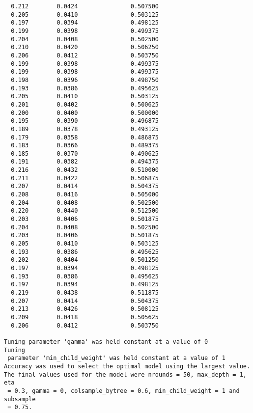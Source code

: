 \documentclass[
  letterpaper,
  DIV=11,
  numbers=noendperiod]{scrartcl}
\begin{document}
\begin{verbatim}
  0.212        0.0424               0.507500              
  0.205        0.0410               0.503125              
  0.197        0.0394               0.498125              
  0.199        0.0398               0.499375              
  0.204        0.0408               0.502500              
  0.210        0.0420               0.506250              
  0.206        0.0412               0.503750              
  0.199        0.0398               0.499375              
  0.199        0.0398               0.499375              
  0.198        0.0396               0.498750              
  0.193        0.0386               0.495625              
  0.205        0.0410               0.503125              
  0.201        0.0402               0.500625              
  0.200        0.0400               0.500000              
  0.195        0.0390               0.496875              
  0.189        0.0378               0.493125              
  0.179        0.0358               0.486875              
  0.183        0.0366               0.489375              
  0.185        0.0370               0.490625              
  0.191        0.0382               0.494375              
  0.216        0.0432               0.510000              
  0.211        0.0422               0.506875              
  0.207        0.0414               0.504375              
  0.208        0.0416               0.505000              
  0.204        0.0408               0.502500              
  0.220        0.0440               0.512500              
  0.203        0.0406               0.501875              
  0.204        0.0408               0.502500              
  0.203        0.0406               0.501875              
  0.205        0.0410               0.503125              
  0.193        0.0386               0.495625              
  0.202        0.0404               0.501250              
  0.197        0.0394               0.498125              
  0.193        0.0386               0.495625              
  0.197        0.0394               0.498125              
  0.219        0.0438               0.511875              
  0.207        0.0414               0.504375              
  0.213        0.0426               0.508125              
  0.209        0.0418               0.505625              
  0.206        0.0412               0.503750              

Tuning parameter 'gamma' was held constant at a value of 0
Tuning
 parameter 'min_child_weight' was held constant at a value of 1
Accuracy was used to select the optimal model using the largest value.
The final values used for the model were nrounds = 50, max_depth = 1, eta
 = 0.3, gamma = 0, colsample_bytree = 0.6, min_child_weight = 1 and subsample
 = 0.75.
\end{verbatim}
\end{document}
